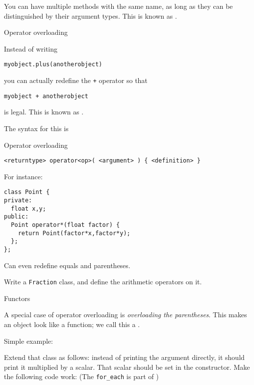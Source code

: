 You can have multiple methods with the same name, as long as they can
be distinguished by their argument types. This is known as .

 {Operator overloading}
\label{sec:operatordef}

Instead of writing 
\begin{lstlisting}
myobject.plus(anotherobject)
\end{lstlisting}
you can actually redefine the \lstinline{+} operator so that
\begin{lstlisting}
myobject + anotherobject
\end{lstlisting}
is legal. This is known as .

The syntax for this is
\begin{block}{Operator overloading}
  \label{sl:object-operator}
\begin{lstlisting}
<returntype> operator<op>( <argument> ) { <definition> }
\end{lstlisting}
For instance:
\begin{lstlisting}
class Point {
private:
  float x,y;
public:
  Point operator*(float factor) {
    return Point(factor*x,factor*y);
  };
};
\end{lstlisting}
Can even redefine equals and parentheses.
\end{block}

\begin{exercise}
  Write a \lstinline{Fraction} class, and define the arithmetic operators on it.
\end{exercise}

 {Functors}

A special case of operator overloading is
%
\emph{overloading the parentheses}. This makes an object look like a
function; we call this a .

Simple example:
%

\begin{exercise}
  \label{ex:functor2}
  Extend that class as follows: instead of printing the argument
  directly, it should print it multiplied by a scalar. That scalar
  should be set in the constructor. Make the following code work:
  (The \lstinline{for_each} is part of )
\end{exercise}


